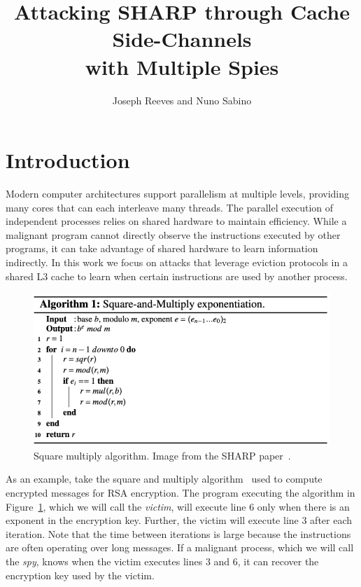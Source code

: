 \documentclass[12pt]{article}
\title{Attacking SHARP through Cache Side-Channels\\with Multiple Spies}
\author{Joseph Reeves and Nuno Sabino}
\begin{document}
\maketitle


\section{Introduction}

Modern computer architectures support parallelism at multiple levels, providing many cores that can each interleave many threads.
The parallel execution of independent processes relies on shared hardware to maintain efficiency.
While a malignant program cannot directly observe the instructions executed by other programs,
it can take advantage of shared hardware to learn information indirectly.
In this work we focus on attacks that leverage eviction protocols in a shared L3 cache to learn when certain instructions are used by another process.

\begin{figure}[h]
\centering
\includegraphics[scale=0.9]{../presentation/sqm.png}
\caption{Square multiply algorithm. Image from the SHARP paper~\cite{sharp}.}
\label{fig:sm}
\end{figure}

As an example, take the square and multiply algorithm~\cite{exp} used to compute encrypted messages for RSA encryption.
The program executing the algorithm in Figure~\ref{fig:sm}, which we will call the {\it victim}, will execute line $6$ only when there is an exponent in the encryption key. 
Further, the victim will execute line $3$ after each iteration.
Note that the time between iterations is large because the instructions are often operating over long messages.
If a malignant process, which we will call the {\it spy}, knows when the victim executes lines $3$ and $6$, it can recover the encryption key used by the victim.
\end{document}
